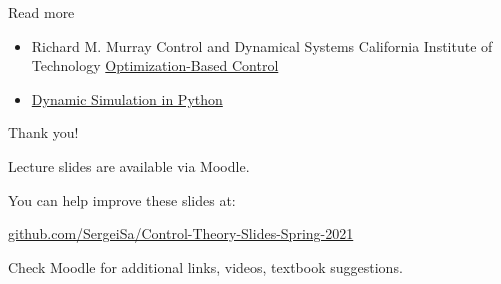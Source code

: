 \documentclass{beamer}
\begin{document}
\begin{frame}{Read more}

\begin{itemize}
\item Richard M. Murray Control and Dynamical Systems California Institute of Technology \href{http://www.cds.caltech.edu/~murray/books/AM08/pdf/obc-trajgen_03Jan10.pdf}{Optimization-Based Control}
\item \href{https://apmonitor.com/pdc/index.php/Main/ModelSimulation}{Dynamic Simulation in Python}


\end{itemize}

\end{frame}



\begin{frame}{Thank you!}
\centerline{Lecture slides are available via Moodle.}
\bigskip
\centerline{You can help improve these slides at:}
\centerline{\href{https://github.com/SergeiSa/Control-Theory-Slides-Spring-2021}{github.com/SergeiSa/Control-Theory-Slides-Spring-2021}}
\bigskip
\centerline{Check Moodle for additional links, videos, textbook suggestions.}
\end{frame}
\end{document}

